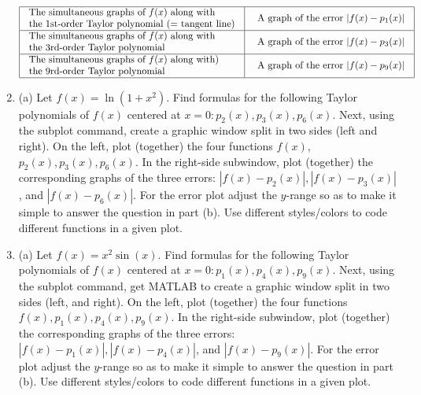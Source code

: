 \documentclass[../main.tex]{subfiles}
\begin{document}
\begin{enumerate}
$
\begin{array}{|l|l|}
\hline \begin{array}{l}
\text {The simultaneous graphs of $f(x)$ along with}\\
\text {the 1st-order Taylor polynomial (= tangent line)}
\end{array} & \begin{array}{l}
\text { A graph of the error $\left|f(x)-p_{1}(x)\right|$}
\end{array} \\
\hline \begin{array}{l}
\text {The simultaneous graphs of $f(x)$ along with}\\
\text {the 3rd-order Taylor polynomial}
\end{array} & \begin{array}{l}
\text { A graph of the error $\left|f(x)-p_{3}(x)\right|$}
\end{array} \\
\hline \begin{array}{l}
\text {The simultaneous graphs of $f(x)$ along with)}\\
\text {the 9rd-order Taylor polynomial}
\end{array} & \begin{array}{l}
\text { A graph of the error $\left|f(x)-p_{9}(x)\right|$}
\end{array} \\
\hline
\end{array}
$ \\



\item (a) Let $f(x)=\ln \left(1+x^{2}\right)$. Find formulas for the following Taylor polynomials of $f(x)$ centered at $x=0: p_{2}(x), p_{3}(x), p_{6}(x)$. Next, using the subplot command, create a graphic window split in two sides (left and right). On the left, plot (together) the four functions $f(x)$, $p_{2}(x), p_{3}(x), p_{6}(x)$. In the right-side subwindow, plot (together) the corresponding graphs of the three errors: $\left|f(x)-p_{2}(x)\right|,\left|f(x)-p_{3}(x)\right|$, and $\left|f(x)-p_{6}(x)\right|$. For the error plot adjust the $y$-range so as to make it simple to answer the question in part (b). Use different styles/colors to code different functions in a given plot.

\item(a) Let $f(x)=x^{2} \sin (x)$. Find formulas for the following Taylor polynomials of $f(x)$ centered at $x=0: p_{1}(x), p_{4}(x), p_{9}(x)$. Next, using the subplot command, get MATLAB to create a graphic window split in two sides (left, and right). On the left, plot (together) the four functions $f(x), p_{1}(x), p_{4}(x), p_{9}(x)$. In the right-side subwindow, plot (together) the corresponding graphs of the three errors: $\left|f(x)-p_{1}(x)\right|,\left|f(x)-p_{4}(x)\right|$, and $\left|f(x)-p_{9}(x)\right|$. For the error plot adjust the $y$-range so as to make it simple to answer the question in part (b). Use different styles/colors to code different functions in a given plot.


\end{enumerate}
\end{document}
